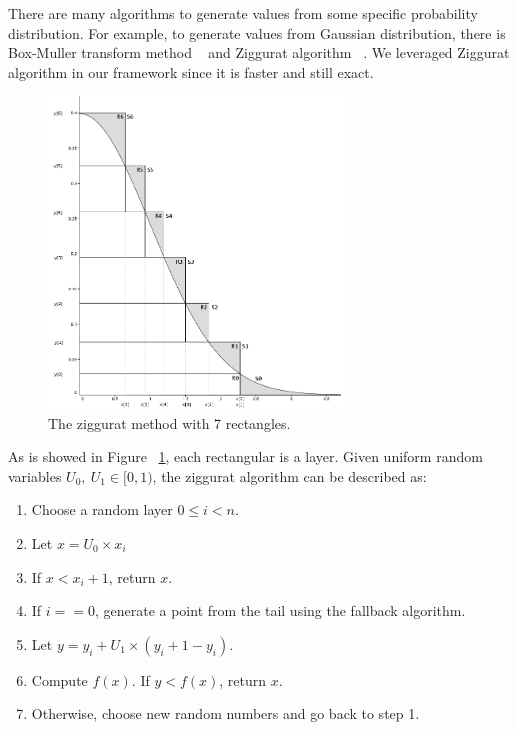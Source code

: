 There are many algorithms to generate values from some specific probability distribution. For example, to generate values from Gaussian distribution, there is Box-Muller transform method ~\cite{box} and Ziggurat algorithm ~\cite{ziggurat}. We leveraged Ziggurat algorithm in our framework since it is faster and still exact. 

\begin{figure}
    \centering
    \includegraphics[width=0.7\textwidth]{figures/ziggurat.png}
    \caption{The ziggurat method with 7 rectangles.}
    \label{fig:ziggurat}
\end{figure}

As is showed in Figure ~\ref{fig:ziggurat}, each rectangular is a layer. Given uniform random variables $U_0,~U_1 \in [0,1)$, the ziggurat algorithm can be described as:
\begin{enumerate}
  \item Choose a random layer $0 \leq i < n$.
  \item Let $x = U_0 \times x_i$
  \item If $x < x_i + 1$, return $x$.
  \item If $i == 0$, generate a point from the tail using the fallback algorithm.
  \item Let $y = y_i + U_1 \times (y_i + 1 - y_i)$.
  \item Compute $f(x)$. If $y < f(x)$, return $x$.
  \item Otherwise, choose new random numbers and go back to step 1.
\end{enumerate}

